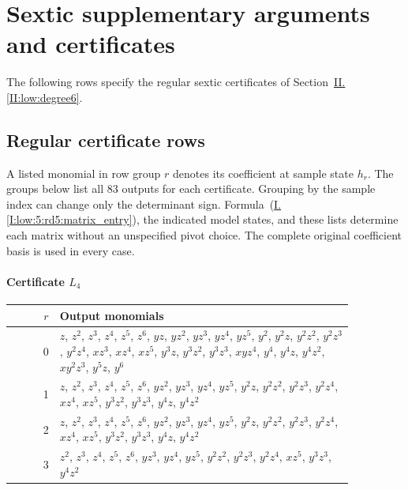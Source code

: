 \documentclass[11pt]{amsart}
\theoremstyle{definition}
\theoremstyle{remark}
\numberwithin{equation}{section}
\newcommand{\partIref}[1]{\hyperref[I:#1]{I.\ref*{I:#1}}}
\newcommand{\partIeqref}[1]{\textup{(\partIref{#1})}}
\newcommand{\partIIref}[1]{\hyperref[II:#1]{II.\ref*{II:#1}}}
\begin{document}
\section{Sextic supplementary arguments and certificates}

\label{supp:sextic}

The following rows specify the regular sextic certificates of Section~\partIIref{low:degree6}.

\subsection{Regular certificate rows}\label{low:6:s6r:rows}

A listed monomial in row group $r$ denotes its coefficient at sample state $h_r$. The groups below list all $83$ outputs for each certificate. Grouping by the sample index can change only the determinant sign. Formula~\partIeqref{low:5:rd5:matrix_entry}, the indicated model states, and these lists determine each matrix without an unspecified pivot choice. The complete original coefficient basis is used in every case.

\paragraph*{Certificate $L_4$}
\begin{center}
\begin{tabular}{rp{0.86\linewidth}}
$r$ & Output monomials\\\hline
0 & \(z\), \(z^{2}\), \(z^{3}\), \(z^{4}\), \(z^{5}\), \(z^{6}\), \(yz\), \(yz^{2}\), \(yz^{3}\), \(yz^{4}\), \(yz^{5}\), \(y^{2}\), \(y^{2}z\), \(y^{2}z^{2}\), \(y^{2}z^{3}\), \(y^{2}z^{4}\), \(xz^{3}\), \(xz^{4}\), \(xz^{5}\), \(y^{3}z\), \(y^{3}z^{2}\), \(y^{3}z^{3}\), \(xyz^{4}\), \(y^{4}\), \(y^{4}z\), \(y^{4}z^{2}\), \(xy^{2}z^{3}\), \(y^{5}z\), \(y^{6}\)\\
1 & \(z\), \(z^{2}\), \(z^{3}\), \(z^{4}\), \(z^{5}\), \(z^{6}\), \(yz^{2}\), \(yz^{3}\), \(yz^{4}\), \(yz^{5}\), \(y^{2}z\), \(y^{2}z^{2}\), \(y^{2}z^{3}\), \(y^{2}z^{4}\), \(xz^{4}\), \(xz^{5}\), \(y^{3}z^{2}\), \(y^{3}z^{3}\), \(y^{4}z\), \(y^{4}z^{2}\)\\
2 & \(z\), \(z^{2}\), \(z^{3}\), \(z^{4}\), \(z^{5}\), \(z^{6}\), \(yz^{2}\), \(yz^{3}\), \(yz^{4}\), \(yz^{5}\), \(y^{2}z\), \(y^{2}z^{2}\), \(y^{2}z^{3}\), \(y^{2}z^{4}\), \(xz^{4}\), \(xz^{5}\), \(y^{3}z^{2}\), \(y^{3}z^{3}\), \(y^{4}z\), \(y^{4}z^{2}\)\\
3 & \(z^{2}\), \(z^{3}\), \(z^{4}\), \(z^{5}\), \(z^{6}\), \(yz^{3}\), \(yz^{4}\), \(yz^{5}\), \(y^{2}z^{2}\), \(y^{2}z^{3}\), \(y^{2}z^{4}\), \(xz^{5}\), \(y^{3}z^{3}\), \(y^{4}z^{2}\)\\
\end{tabular}
\end{center}
\end{document}
